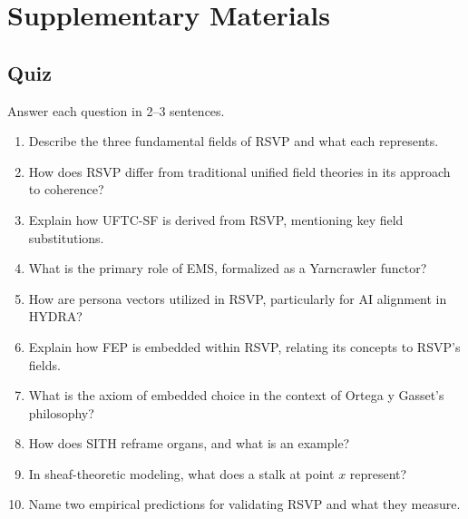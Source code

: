 \documentclass[12pt]{report}
\begin{document}
{{{{\part{Supplementary Materials}

\chapter{Quiz}
Answer each question in 2–3 sentences.
\begin{enumerate}
    \item Describe the three fundamental fields of RSVP and what each represents.
    \item How does RSVP differ from traditional unified field theories in its approach to coherence?
    \item Explain how UFTC-SF is derived from RSVP, mentioning key field substitutions.
    \item What is the primary role of EMS, formalized as a Yarncrawler functor?
    \item How are persona vectors utilized in RSVP, particularly for AI alignment in HYDRA?
    \item Explain how FEP is embedded within RSVP, relating its concepts to RSVP’s fields.
    \item What is the axiom of embedded choice in the context of Ortega y Gasset’s philosophy?
    \item How does SITH reframe organs, and what is an example?
    \item In sheaf-theoretic modeling, what does a stalk at point \(x\) represent?
    \item Name two empirical predictions for validating RSVP and what they measure.
\end{enumerate}

}}}}
\end{document}
